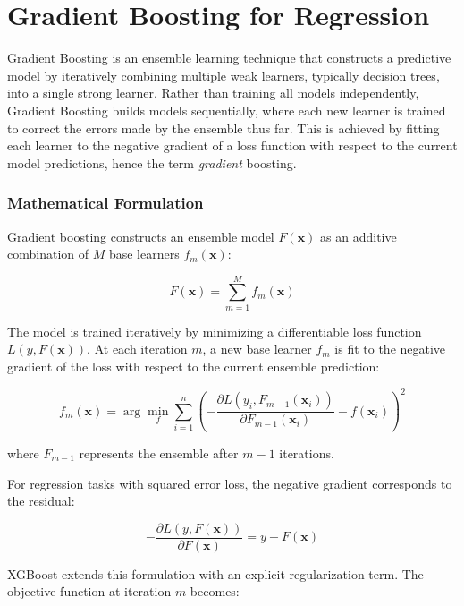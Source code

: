 \section{Gradient Boosting for Regression}

Gradient Boosting is an ensemble learning technique that constructs a predictive model by iteratively combining multiple weak learners, typically decision trees, into a single strong learner. Rather than training all models independently, Gradient Boosting builds models sequentially, where each new learner is trained to correct the errors made by the ensemble thus far. This is achieved by fitting each learner to the negative gradient of a loss function with respect to the current model predictions, hence the term \emph{gradient} boosting.

\subsubsection*{Mathematical Formulation}

Gradient boosting constructs an ensemble model $F(\mathbf{x})$ as an additive combination of $M$ base learners $f_m(\mathbf{x})$:

\begin{equation}
F(\mathbf{x}) = \sum_{m=1}^{M} f_m(\mathbf{x})
\end{equation}

The model is trained iteratively by minimizing a differentiable loss function $L(y, F(\mathbf{x}))$. At each iteration $m$, a new base learner $f_m$ is fit to the negative gradient of the loss with respect to the current ensemble prediction:

\begin{equation}
f_m(\mathbf{x}) = \arg\min_{f} \sum_{i=1}^{n} \left( -\frac{\partial L(y_i, F_{m-1}(\mathbf{x}_i))}{\partial F_{m-1}(\mathbf{x}_i)} - f(\mathbf{x}_i) \right)^2
\end{equation}

where $F_{m-1}$ represents the ensemble after $m-1$ iterations.

For regression tasks with squared error loss, the negative gradient corresponds to the residual:

\begin{equation}
-\frac{\partial L(y, F(\mathbf{x}))}{\partial F(\mathbf{x})} = y - F(\mathbf{x})
\end{equation}

XGBoost extends this formulation with an explicit regularization term. The objective function at iteration $m$ becomes:

